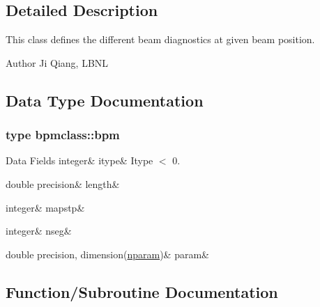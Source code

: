 \subsection{Detailed Description}
This class defines the different beam diagnostics at given beam position. 

\begin{DoxyAuthor}{Author}
Ji Qiang, L\+B\+NL 
\end{DoxyAuthor}


\subsection{Data Type Documentation}
\label{structbpmclass_1_1bpm}
\subsubsection{type bpmclass\+::bpm}
\begin{DoxyFields}{Data Fields}
\mbox{\label{namespacebpmclass_a8759ea53c8b66bbdb08055405fff79a0}} 
integer&
itype&
Itype $<$ 0. \\
\hline

\mbox{\label{namespacebpmclass_a91bf471e42c1c733f27253fe367c02e1}} 
double precision&
length&
\\
\hline

\mbox{\label{namespacebpmclass_a57b5d567476a69c20de780f6fb8d0a2e}} 
integer&
mapstp&
\\
\hline

\mbox{\label{namespacebpmclass_af47828f23a39ecfbef81048d780c4107}} 
integer&
nseg&
\\
\hline

\mbox{\label{namespacebpmclass_ab4cbff356dd68d8a0563cb3b1d4ae235}} 
double precision, dimension(\mbox{\hyperlink{namespacebpmclass_ac2f2f373976236d08c9c68de895950eb}{nparam}})&
param&
\\
\hline

\end{DoxyFields}


\subsection{Function/\+Subroutine Documentation}
\mbox{\label{namespacebpmclass_a777700e03d6422437747b159baf8ac47}} 

